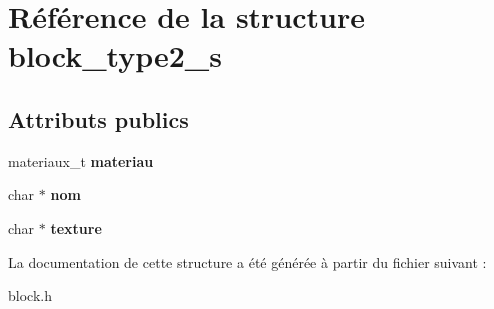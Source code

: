\hypertarget{structblock__type2__s}{}\section{Référence de la structure block\+\_\+type2\+\_\+s}
\label{structblock__type2__s}
\subsection*{Attributs publics}
\begin{DoxyCompactItemize}
\item 
\mbox{\label{structblock__type2__s_a5a92468e8fa612d4d6b13808da3ab078}} 
materiaux\+\_\+t {\bfseries materiau}
\item 
\mbox{\label{structblock__type2__s_a8ce4e8f7967a2c24eeaaee1df7d8c86d}} 
char $\ast$ {\bfseries nom}
\item 
\mbox{\label{structblock__type2__s_afe2ae7adf235d70a8ca33856704e9c6b}} 
char $\ast$ {\bfseries texture}
\end{DoxyCompactItemize}


La documentation de cette structure a été générée à partir du fichier suivant \+:\begin{DoxyCompactItemize}
\item 
block.\+h\end{DoxyCompactItemize}
